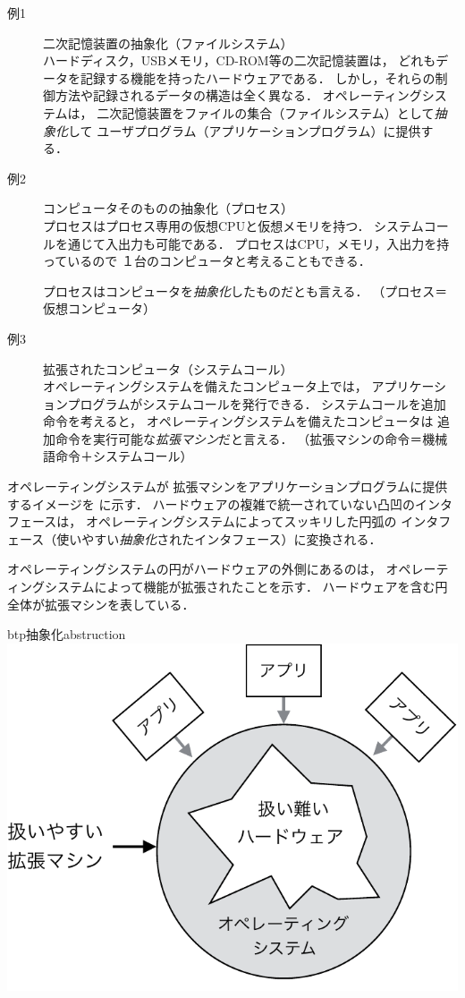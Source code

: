 \begin{description}
\item[例1] 二次記憶装置の抽象化（ファイルシステム） \\
  ハードディスク，USBメモリ，CD-ROM等の二次記憶装置は，
  どれもデータを記録する機能を持ったハードウェアである．
  しかし，それらの制御方法や記録されるデータの構造は全く異なる．
  オペレーティングシステムは，
  二次記憶装置をファイルの集合（ファイルシステム）として\emph{抽象化}して
  ユーザプログラム（アプリケーションプログラム）に提供する．

\item[例2] コンピュータそのものの抽象化（プロセス） \\
  プロセスはプロセス専用の仮想CPUと仮想メモリを持つ．
  システムコールを通じて入出力も可能である．
  プロセスはCPU，メモリ，入出力を持っているので
  １台のコンピュータと考えることもできる．

  プロセスはコンピュータを\emph{抽象化}したものだとも言える．
  （プロセス＝仮想コンピュータ）

\item[例3] 拡張されたコンピュータ（システムコール） \\
  オペレーティングシステムを備えたコンピュータ上では，
  アプリケーションプログラムがシステムコールを発行できる．
  システムコールを追加命令を考えると，
  オペレーティングシステムを備えたコンピュータは
  追加命令を実行可能な\emph{拡張マシン}だと言える．
  （拡張マシンの命令＝機械語命令＋システムコール）
\end{description}

オペレーティングシステムが
拡張マシンをアプリケーションプログラムに提供するイメージを
に示す．
ハードウェアの複雑で統一されていない凸凹のインタフェースは，
オペレーティングシステムによってスッキリした円弧の
インタフェース（使いやすい\emph{抽象化}されたインタフェース）に変換される．

オペレーティングシステムの円がハードウェアの外側にあるのは，
オペレーティングシステムによって機能が拡張されたことを示す．
ハードウェアを含む円全体が拡張マシンを表している．

\begin{myfig}{btp}{抽象化}{abstruction}
  \includegraphics[scale=0.66]{Fig/abstruction-crop.pdf}
\end{myfig}

